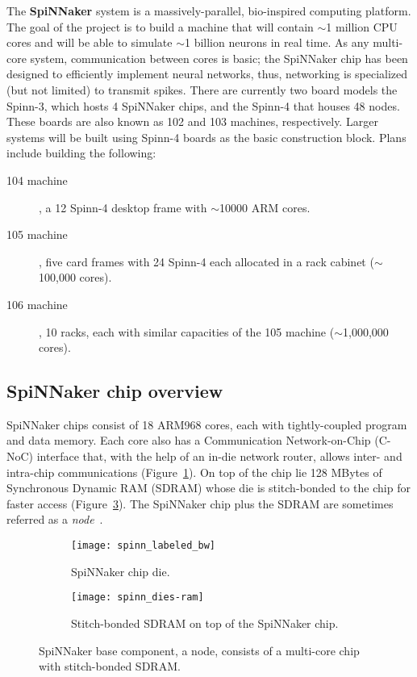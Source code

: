 The \textbf{SpiNNaker} system is a massively-parallel, bio-inspired computing platform. The goal of the project is to build a machine that will contain $\sim$1 million CPU cores and will be able to simulate $\sim$1 billion neurons in real time. As any multi-core system, communication between cores is basic; the SpiNNaker chip has been designed to efficiently implement neural networks, thus, networking is specialized (but not limited) to transmit spikes. There are currently two board models the Spinn-3, which hosts 4 SpiNNaker chips, and the Spinn-4 that houses 48 nodes. These boards are also known as 102 and 103 machines, respectively. Larger systems will be built using Spinn-4 boards as the basic construction block. Plans include building the following: 
\begin{description}
  \item[104 machine], a 12 Spinn-4 desktop frame with $\sim$10000 ARM cores.
  \item[105 machine], five card frames with 24 Spinn-4 each allocated in a rack cabinet ($\sim$100,000 cores).
  \item[106 machine], 10 racks, each with similar capacities of the 105 machine ($\sim$1,000,000 cores).
\end{description}

\subsection{SpiNNaker chip overview}

SpiNNaker chips consist of 18 ARM968 cores, each with tightly-coupled program and data memory. Each core also has a Communication Network-on-Chip (C-NoC) interface that, with the help of an in-die network router, allows inter- and intra-chip communications (Figure~\ref{fig:hw:spinnaker-die}). On top of the chip lie 128 MBytes of Synchronous Dynamic RAM (SDRAM) whose die is stitch-bonded to the chip for faster access (Figure~\ref{fig:hw:bonded-sdram}). The SpiNNaker chip plus the SDRAM are sometimes referred as a \emph{node}~\cite{furber2013overview}.

\begin{figure}[h]
  \begin{center}
    \begin{subfigure}[b]{0.55\textwidth}
      \texttt{[image: spinn\_labeled\_bw]}
      \caption{SpiNNaker chip die.}
      \label{fig:hw:spinnaker-die}
    \end{subfigure}
    \hspace*{0.3cm}
    \begin{subfigure}[b]{0.4\textwidth}
      \texttt{[image: spinn\_dies-ram]}
      \caption{Stitch-bonded SDRAM on top of the SpiNNaker chip.}
      \label{fig:hw:bonded-sdram}
    \end{subfigure}
    \caption{SpiNNaker base component, a node, consists of a multi-core chip with stitch-bonded SDRAM.}
  \end{center}
\end{figure}

